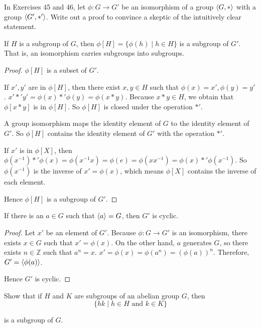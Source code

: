 In Exercises 45 and 46, let $\phi: G \to G'$ be an isomorphism of a group $\left\langle{G, *}\right\rangle$ with a group $\left\langle{G', *'}\right\rangle$. Write out a proof to convince a skeptic of the intuitively clear statement.

\begin{exercise}
    If $H$ is a subgroup of $G$, then $\phi[H] = \{ \phi(h) \mid h\in H \}$ is a subgroup of $G'$. That is, an isomorphism carries subgroups into subgroups.
\end{exercise}

\begin{proof}
    $\phi[H]$ is a subset of $G'$.

    If $x', y'$ are in $\phi[H]$, then there exist $x, y\in H$ such that $\phi(x) = x', \phi(y) = y'$. $x' *' y' = \phi(x) *' \phi(y) = \phi(x * y)$. Because $x * y \in H$, we obtain that $\phi[x * y]$ is in $\phi[H]$. So $\phi[H]$ is closed under the operation $*'$.

    A group isomorphism maps the identity element of $G$ to the identity element of $G'$. So $\phi[H]$ contains the identity element of $G'$ with the operation $*'$.

    If $x'$ is in $\phi[X]$, then $\phi(x^{-1}) *' \phi(x) = \phi(x^{-1}x) = \phi(e) = \phi(xx^{-1}) = \phi(x) *' \phi(x^{-1})$. So $\phi(x^{-1})$ is the inverse of $x' = \phi(x)$, which means $\phi[X]$ contains the inverse of each element.

    Hence $\phi[H]$ is a subgroup of $G'$.
\end{proof}

\begin{exercise}
    If there is an $a\in G$ such that $\left\langle{a}\right\rangle = G$, then $G'$ is cyclic.
\end{exercise}

\begin{proof}
    Let $x'$ be an element of $G'$. Because $\phi: G \to G'$ is an isomorphism, there exists $x\in G$ such that $x' = \phi(x)$. On the other hand, $a$ generates $G$, so there exists $n\in\mathbb{Z}$ such that $a^{n} = x$. $x' = \phi(x) = \phi(a^{n}) = {(\phi(a))}^{n}$. Therefore, $G' = \left\langle{\phi(a)}\right\rangle$.

    Hence $G'$ is cyclic.
\end{proof}

\begin{exercise}
    Show that if $H$ and $K$ are subgroups of an abelian group $G$, then
    \[
        \{ hk \mid h\in H \text{ and } k\in K \}
    \]

    is a subgroup of $G$.
\end{exercise}

